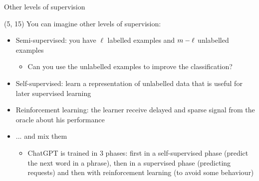 \begin{frame}{Other levels of supervision}
  \note{
    \begin{itemize}
    \item
    \end{itemize}
  }

  \begin{textblock}{90}(5, 15)
    You can imagine other levels of supervision:
    \begin{itemize}
    \item<2-> Semi-supervised: you have $\ell$ labelled examples and
      $m - \ell$ unlabelled examples
      \begin{itemize}
      \item Can you use the unlabelled examples to improve the classification?
      \end{itemize}
    \item<3-> Self-supervised: learn a representation of unlabelled data that is
      useful for later supervised learning
    \item<4-> Reinforcement learning: the learner receive delayed and sparse signal
      from the oracle about his performance
    \item<5-> ... and mix them
      \begin{itemize}
      \item ChatGPT is trained in 3 phases: first in a self-supervised phase
        (predict the next word in a phrase),
        then in a supervised phase (predicting requests) and then with
        reinforcement learning (to avoid some behaviour)
      \end{itemize}
    \end{itemize}
  \end{textblock}

\end{frame}


